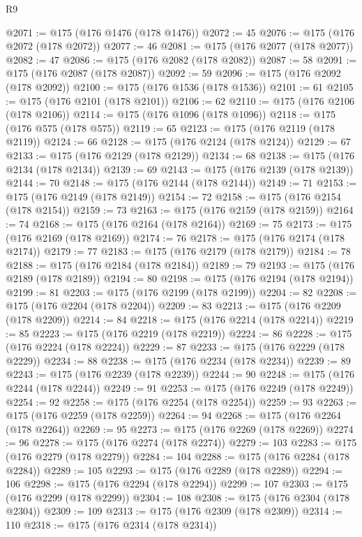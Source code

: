\begin{lexlean}{R9}
\begin{coremodule}
{{{{{{{{{{{{{{{{{{{{{{{{{{{{{{{{{{{{{{{{{{{{{{{{{{{{{{{{{{{{{{{{{{{{{{{{{{{{{{{{{{{{{{{{{{{{{{{{{{{{{{{{{{{{@2071 := @175 (@176 @1476 (@178 @1476))
@2072 := 45
@2076 := @175 (@176 @2072 (@178 @2072))
@2077 := 46
@2081 := @175 (@176 @2077 (@178 @2077))
@2082 := 47
@2086 := @175 (@176 @2082 (@178 @2082))
@2087 := 58
@2091 := @175 (@176 @2087 (@178 @2087))
@2092 := 59
@2096 := @175 (@176 @2092 (@178 @2092))
@2100 := @175 (@176 @1536 (@178 @1536))
@2101 := 61
@2105 := @175 (@176 @2101 (@178 @2101))
@2106 := 62
@2110 := @175 (@176 @2106 (@178 @2106))
@2114 := @175 (@176 @1096 (@178 @1096))
@2118 := @175 (@176 @575 (@178 @575))
@2119 := 65
@2123 := @175 (@176 @2119 (@178 @2119))
@2124 := 66
@2128 := @175 (@176 @2124 (@178 @2124))
@2129 := 67
@2133 := @175 (@176 @2129 (@178 @2129))
@2134 := 68
@2138 := @175 (@176 @2134 (@178 @2134))
@2139 := 69
@2143 := @175 (@176 @2139 (@178 @2139))
@2144 := 70
@2148 := @175 (@176 @2144 (@178 @2144))
@2149 := 71
@2153 := @175 (@176 @2149 (@178 @2149))
@2154 := 72
@2158 := @175 (@176 @2154 (@178 @2154))
@2159 := 73
@2163 := @175 (@176 @2159 (@178 @2159))
@2164 := 74
@2168 := @175 (@176 @2164 (@178 @2164))
@2169 := 75
@2173 := @175 (@176 @2169 (@178 @2169))
@2174 := 76
@2178 := @175 (@176 @2174 (@178 @2174))
@2179 := 77
@2183 := @175 (@176 @2179 (@178 @2179))
@2184 := 78
@2188 := @175 (@176 @2184 (@178 @2184))
@2189 := 79
@2193 := @175 (@176 @2189 (@178 @2189))
@2194 := 80
@2198 := @175 (@176 @2194 (@178 @2194))
@2199 := 81
@2203 := @175 (@176 @2199 (@178 @2199))
@2204 := 82
@2208 := @175 (@176 @2204 (@178 @2204))
@2209 := 83
@2213 := @175 (@176 @2209 (@178 @2209))
@2214 := 84
@2218 := @175 (@176 @2214 (@178 @2214))
@2219 := 85
@2223 := @175 (@176 @2219 (@178 @2219))
@2224 := 86
@2228 := @175 (@176 @2224 (@178 @2224))
@2229 := 87
@2233 := @175 (@176 @2229 (@178 @2229))
@2234 := 88
@2238 := @175 (@176 @2234 (@178 @2234))
@2239 := 89
@2243 := @175 (@176 @2239 (@178 @2239))
@2244 := 90
@2248 := @175 (@176 @2244 (@178 @2244))
@2249 := 91
@2253 := @175 (@176 @2249 (@178 @2249))
@2254 := 92
@2258 := @175 (@176 @2254 (@178 @2254))
@2259 := 93
@2263 := @175 (@176 @2259 (@178 @2259))
@2264 := 94
@2268 := @175 (@176 @2264 (@178 @2264))
@2269 := 95
@2273 := @175 (@176 @2269 (@178 @2269))
@2274 := 96
@2278 := @175 (@176 @2274 (@178 @2274))
@2279 := 103
@2283 := @175 (@176 @2279 (@178 @2279))
@2284 := 104
@2288 := @175 (@176 @2284 (@178 @2284))
@2289 := 105
@2293 := @175 (@176 @2289 (@178 @2289))
@2294 := 106
@2298 := @175 (@176 @2294 (@178 @2294))
@2299 := 107
@2303 := @175 (@176 @2299 (@178 @2299))
@2304 := 108
@2308 := @175 (@176 @2304 (@178 @2304))
@2309 := 109
@2313 := @175 (@176 @2309 (@178 @2309))
@2314 := 110
@2318 := @175 (@176 @2314 (@178 @2314))
}}}}}}}}}}}}}}}}}}}}}}}}}}}}}}}}}}}}}}}}}}}}}}}}}}}}}}}}}}}}}}}}}}}}}}}}}}}}}}}}}}}}}}}}}}}}}}}}}}}}}}}}}}}}
\end{coremodule}
\end{lexlean}
